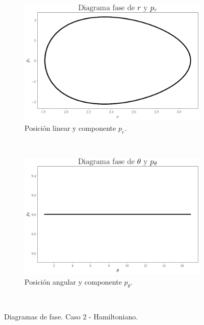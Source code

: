 \documentclass[12pt,letterpaper]{article}
\begin{document}
\begin{figure}
    \centering
    \begin{subfigure}[b]{0.8\textwidth}
        \includegraphics[width=\textwidth]{hamilton_case04_phase_r_pr}
        \caption{Posición linear y componente $p_r$.}
        \label{fig:case 4 phase r hamilton}
    \end{subfigure}
    ~ %
    \begin{subfigure}[b]{0.8\textwidth}
        \includegraphics[width=\textwidth]{hamilton_case04_phase_theta_ptheta}
        \caption{Posición angular y componente $p_\theta$.}
        \label{fig:case 4 phase theta hamilton}
    \end{subfigure}
    ~ %
    \caption{Diagramas de fase. Caso 2 - Hamiltoniano.}\label{fig:case 4 phase plot hamilton}
\end{figure}

\end{document}
